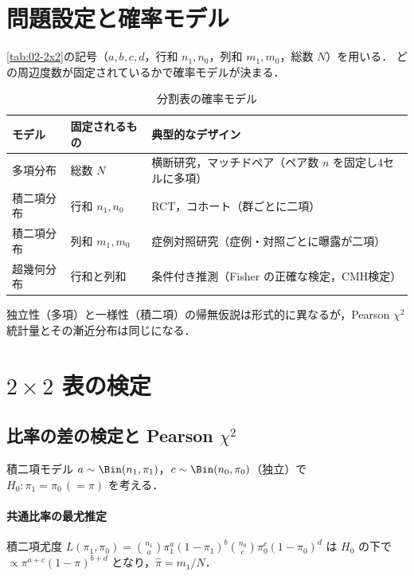 
\section{問題設定と確率モデル}\label{sec:04-model}
\cref{tab:02-2x2}の記号（$a,b,c,d$，行和 $n_1,n_0$，列和 $m_1,m_0$，総数 $N$）を用いる．
どの周辺度数が固定されているかで確率モデルが決まる．
\begin{table}[htbp]
\centering\small
\caption{分割表の確率モデル}\label{tab:04-models}
\begin{tabular}{@{}lL{42mm}L{65mm}@{}}
\toprule
モデル & 固定されるもの & 典型的なデザイン\\
\midrule
多項分布 & 総数 $N$ & 横断研究，マッチドペア（ペア数 $n$ を固定し4セルに多項）\\
積二項分布 & 行和 $n_1,n_0$ & RCT，コホート（群ごとに二項）\\
積二項分布 & 列和 $m_1,m_0$ & 症例対照研究（症例・対照ごとに曝露が二項）\\
超幾何分布 & 行和と列和 & 条件付き推測（Fisher の正確な検定，CMH検定）\\
\bottomrule
\end{tabular}
\end{table}
独立性（多項）と一様性（積二項）の帰無仮説は形式的に異なるが，Pearson $\chi^2$ 統計量とその漸近分布は同じになる．

\section{\texorpdfstring{$2\times2$}{2×2} 表の検定}\label{sec:04-2x2test}
\subsection{比率の差の検定と Pearson \texorpdfstring{$\chi^2$}{χ²}}\label{subsec:04-pearson}
積二項モデル $a\sim\Bin(n_1,\pi_1)$，$c\sim\Bin(n_0,\pi_0)$（独立）で $H_0:\pi_1=\pi_0\,(=\pi)$ を考える．
\paragraph{共通比率の最尤推定}
積二項尤度 $L(\pi_1,\pi_0)=\binom{n_1}{a}\pi_1^a(1-\pi_1)^{b}\binom{n_0}{c}\pi_0^c(1-\pi_0)^d$ は $H_0$ の下で
$\propto\pi^{a+c}(1-\pi)^{b+d}$ となり，$\hat\pi=m_1/N$．
